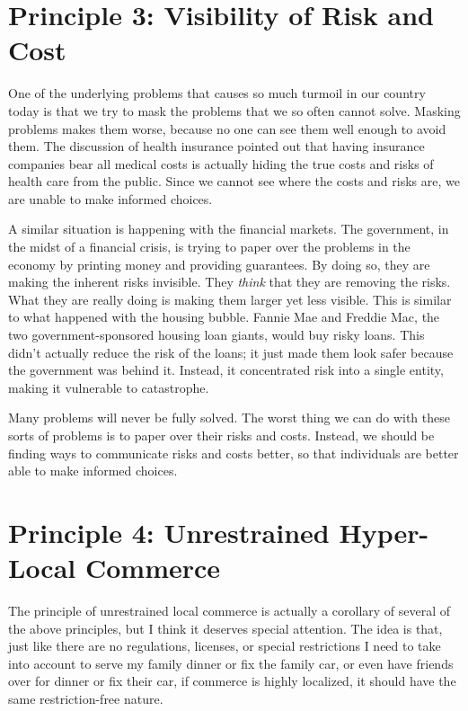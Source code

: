 \section{Principle 3: Visibility of Risk and Cost}

One of the underlying problems that causes so much turmoil in our
country today is that we try to mask the
problems that we so often cannot solve.  Masking problems makes them
worse, because no one can see them well enough to avoid them. The discussion of health insurance
pointed out that having insurance companies bear all medical costs is
actually hiding the true costs and risks of health care from the
public. Since we cannot see where the costs and risks are, we are
unable to make informed choices.

A similar situation is happening with the financial markets. The
government, in the midst of a financial crisis,
is trying to paper over the problems in the economy by printing money and
providing guarantees. By doing so, they
are making the inherent risks invisible. They \textit{think} that they are
removing the risks. What they are really doing is making them larger
yet less visible. This is similar to what happened with the housing
bubble. Fannie Mae and Freddie Mac, the two government-sponsored
housing loan giants, would buy risky loans. This
didn't actually reduce the risk of the loans; it just
made them look safer because the government was behind it. Instead, it
concentrated risk into a single entity, making it vulnerable to
catastrophe.

Many problems will never be fully solved. The worst thing we can do with
these sorts of problems is to paper over their risks and costs.
Instead, we should be finding ways to communicate risks and costs
better, so that individuals are better able to make informed
choices.

\section{Principle 4: Unrestrained Hyper-Local Commerce}

The principle of unrestrained local commerce is actually a corollary of
several of the above principles, but I think it deserves special
attention. The idea is that, just like there are no regulations,
licenses, or special restrictions I need to take into account to serve
my family dinner or fix the family car, or even have friends over for
dinner or fix their car, if commerce is highly localized, it should
have the same restriction-free nature.

